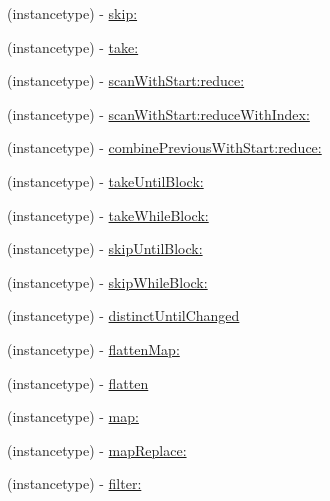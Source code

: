 \begin{DoxyCompactItemize}
\item 
(instancetype) -\/ \mbox{\hyperlink{category_r_a_c_stream_07_operations_08_a1525f1607d8ff7f04a0afc1a5193436a}{skip\+:}}
\item 
(instancetype) -\/ \mbox{\hyperlink{category_r_a_c_stream_07_operations_08_af0264b38dc4acd9334d2e42b1ce21b05}{take\+:}}
\item 
(instancetype) -\/ \mbox{\hyperlink{category_r_a_c_stream_07_operations_08_aa86990e9bc4cbc3dff2815f56b907b41}{scan\+With\+Start\+:reduce\+:}}
\item 
(instancetype) -\/ \mbox{\hyperlink{category_r_a_c_stream_07_operations_08_a69cedeb6e96a6d4154f2256fdcbe27b1}{scan\+With\+Start\+:reduce\+With\+Index\+:}}
\item 
(instancetype) -\/ \mbox{\hyperlink{category_r_a_c_stream_07_operations_08_a698f6ef68be8d3cb34f9be6efaaa5af7}{combine\+Previous\+With\+Start\+:reduce\+:}}
\item 
(instancetype) -\/ \mbox{\hyperlink{category_r_a_c_stream_07_operations_08_ac19d57150840e93112646eef310c2489}{take\+Until\+Block\+:}}
\item 
(instancetype) -\/ \mbox{\hyperlink{category_r_a_c_stream_07_operations_08_ae3b27f126fffcf5dfb8eaa6bd71c5fc4}{take\+While\+Block\+:}}
\item 
(instancetype) -\/ \mbox{\hyperlink{category_r_a_c_stream_07_operations_08_a008935d03ebc55b40b461dc080cddd38}{skip\+Until\+Block\+:}}
\item 
(instancetype) -\/ \mbox{\hyperlink{category_r_a_c_stream_07_operations_08_a1e323c308071aed5e01627d4d96ca9c8}{skip\+While\+Block\+:}}
\item 
(instancetype) -\/ \mbox{\hyperlink{category_r_a_c_stream_07_operations_08_a3af010b929b0c232ddbaa52f574fb888}{distinct\+Until\+Changed}}
\item 
(instancetype) -\/ \mbox{\hyperlink{category_r_a_c_stream_07_operations_08_a2441b0306adc6ae2845219f8b116119a}{flatten\+Map\+:}}
\item 
(instancetype) -\/ \mbox{\hyperlink{category_r_a_c_stream_07_operations_08_a02767823dfe3d4682709e066e15e388c}{flatten}}
\item 
(instancetype) -\/ \mbox{\hyperlink{category_r_a_c_stream_07_operations_08_ae8e14cc70fb3979e6128d28b003bba3f}{map\+:}}
\item 
(instancetype) -\/ \mbox{\hyperlink{category_r_a_c_stream_07_operations_08_a9e55da434f4cf84e14f9133ac48383b8}{map\+Replace\+:}}
\item 
(instancetype) -\/ \mbox{\hyperlink{category_r_a_c_stream_07_operations_08_ae6a990d05708acea33f1c31102f4989b}{filter\+:}}

\end{DoxyCompactItemize}
